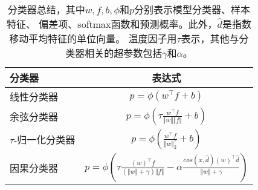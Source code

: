 \begin{table}[htbp]
\small
\centering
\captionsetup{font=footnotesize}
\caption{分类器总结，其中$w,f,b,\phi$和$p$分别表示模型分类器、样本特征、
偏差项、softmax函数和预测概率。此外，$\hat{d}$是指数移动平均特征的单位向量。
温度因子用$\tau$表示，其他与分类器相关的超参数包括$\gamma$和$\alpha$。}
\begin{tabular}{lc}
\toprule
分类器 & 表达式 \\
\midrule
线性分类器 & $p=\phi(w^\top f+b)$ \\
余弦分类器 & $p=\phi(\tau \frac{w^\top f}{\Vert w \Vert \Vert f \Vert}+b)$ \\
$\tau$-归一化分类器 & $p=\phi(\frac{w^\top f}{\Vert w \Vert^{\tau}_2}+b)$ \\
因果分类器 & $p=\phi(\tau \frac{(w)^{\top} f}{(\Vert w \Vert + \gamma)\Vert f \Vert}
- \alpha \frac{cos(x,\hat{d})(w)^{\top}\hat{d}}{\Vert w \Vert + \gamma})$ \\
\bottomrule
\end{tabular}%
\label{tab:addlabel}%
\end{table}%